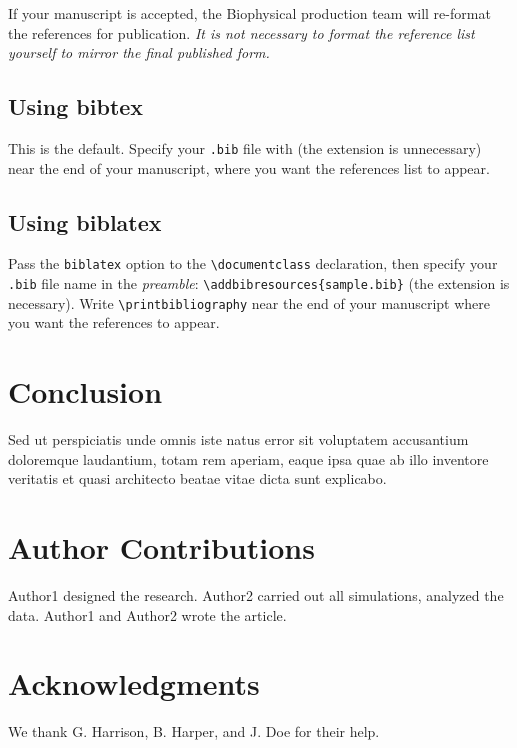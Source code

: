 \documentclass{biophys-new}
\begin{document}
If your manuscript is accepted, the Biophysical production team will re-format the references for publication. \emph{It is not necessary to format the reference list yourself to mirror the final published form.}

\subsection*{Using bibtex} 
This is the default. Specify your \texttt{.bib} file with \verb|| (the extension is unnecessary) near the end of your manuscript, where you want the references list to appear.

\subsection*{Using biblatex} 
Pass the \texttt{biblatex} option to the \verb|\documentclass| declaration, then specify your \texttt{.bib} file name in the \emph{preamble}: \verb|\addbibresources{sample.bib}| (the extension is necessary). Write \verb|\printbibliography| near the end of your manuscript where you want the references to appear.

\section*{Conclusion}

Sed ut perspiciatis unde omnis iste natus error sit voluptatem accusantium doloremque laudantium, totam rem aperiam, eaque ipsa quae ab illo inventore veritatis et quasi architecto beatae vitae dicta sunt explicabo. 

\section*{Author Contributions}

Author1 designed the research. Author2 carried out all simulations, analyzed the data. Author1 and Author2 wrote the article. 

\section*{Acknowledgments}

We thank G. Harrison, B. Harper, and J. Doe for their help.



\end{document}
